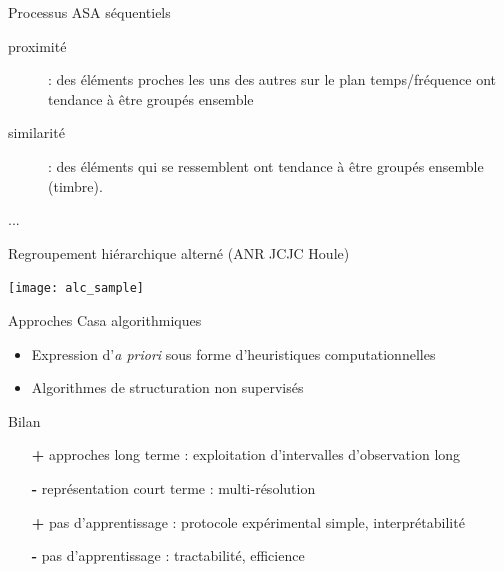 \begin{frame}{Processus ASA \og séquentiels \fg}
\begin{description}
\item[proximité] : des éléments proches les uns des autres sur le plan temps/fréquence ont tendance à être groupés ensemble
\item[similarité] : des éléments qui se ressemblent ont tendance à être groupés ensemble (timbre). 
\item[...]
\end{description}
\end{frame}

\begin{frame}{Regroupement hiérarchique alterné (ANR JCJC Houle)}
\begin{center}
   \texttt{[image: alc\_sample]}  
\end{center}
\end{frame}

\begin{frame}{Approches Casa \fg algorithmiques \og}
\begin{itemize}
\item Expression d'\textit{a priori} sous forme d'heuristiques computationnelles
\item Algorithmes de structuration non supervisés
\end{itemize}
\begin{block}{Bilan}
\begin{itemize}
\item[\textbf{+}] approches long terme : exploitation d'intervalles d'observation long
\item[\alert{\textbf{-}}] représentation court terme : multi-résolution
\item[\textbf{+}] pas d'apprentissage : protocole expérimental simple, interprétabilité
\item[\alert{\textbf{-}}] pas d'apprentissage : tractabilité, efficience
\end{itemize}
\end{block}
\end{frame}